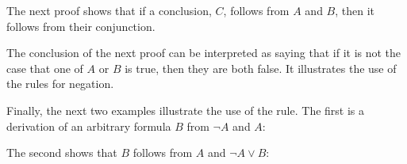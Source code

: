 \documentclass[letterpaper,10pt,english]{sphinxmanual}
\begin{document}
\begin{center}
\AXM{}
\AXM{}
\AXM{}
\DP
\end{center}

\sphinxAtStartPar
The next proof shows that if a conclusion, \(C\), follows from \(A\) and \(B\), then it follows from their conjunction.



\begin{center}
\AXM{}
\AXM{}
\AXM{}
\DP
\end{center}

\sphinxAtStartPar
The conclusion of the next proof can be interpreted as saying that if it is not the case that one of \(A\) or \(B\) is true, then they are both false. It illustrates the use of the rules for negation.



\begin{center}
\AXM{}
\AXM{}
\BIM{\bot}
\AXM{}
\AXM{}
\BIM{\bot}
\DP
\end{center}

\sphinxAtStartPar
Finally, the next two examples illustrate the use of the  rule. The first is a derivation of an arbitrary formula \(B\) from \(\neg A\) and \(A\):



\begin{center}
\BIM{\bot}
\DP
\end{center}

\sphinxAtStartPar
The second shows that \(B\) follows from \(A\) and \(\neg A \vee B\):



\begin{center}
\AXM{}
\BIM{\bot}
\AXM{}
\DP
\end{center}
\end{document}
